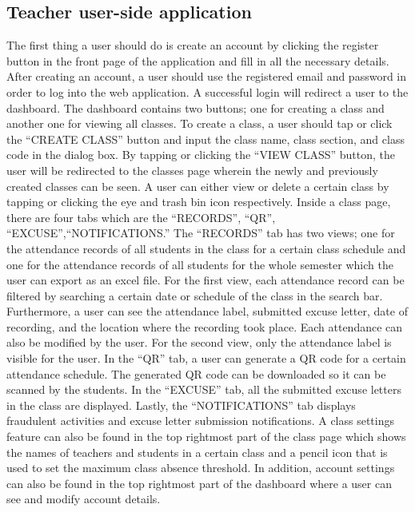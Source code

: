 \documentclass[journal]{./IEEE/IEEEtran}
\begin{document}
\subsection{Teacher user-side application}
The first thing a user should do is create an account by clicking the register button in the front page of the application and fill in all the necessary details. After creating an account, a user should use the registered email and password in order to log into the web application. A successful login will redirect a user to the dashboard. The dashboard contains two buttons; one for creating a class and another one for viewing all classes. To create a class, a user should tap or click the “CREATE CLASS” button and input the class name, class section, and class code in the dialog box. By tapping or clicking the “VIEW CLASS” button, the user will be redirected to the classes page wherein the newly and previously created classes can be seen. A user can either view or delete a certain class by tapping or clicking the eye and trash bin icon respectively. Inside a class page, there are four tabs which are the “RECORDS”, “QR”, “EXCUSE”,“NOTIFICATIONS.” The “RECORDS” tab has two views; one for the attendance records of all students in the class for a certain class schedule and one for the attendance records of all students for the whole semester which the user can export as an excel file. For the first view, each attendance record can be filtered by searching a certain date or schedule of the class in the search bar. Furthermore, a user can see the attendance label, submitted excuse letter, date of recording, and the location where the recording took place. Each attendance can also be modified by the user. For the second view, only the attendance label is visible for the user. In the “QR” tab, a user can generate a QR code for a certain attendance schedule. The generated QR code can be downloaded so it can be scanned by the students. In the “EXCUSE” tab, all the submitted excuse letters in the class are displayed. Lastly, the “NOTIFICATIONS” tab displays fraudulent activities and excuse letter submission notifications.  A class settings feature can also be found in the top rightmost part of the class page which shows the names of teachers and students in a certain class and a pencil icon that is used to set the maximum class absence threshold. In addition, account settings can also be found in the top rightmost part of the dashboard where a user can see and modify account details.
\end{document}
